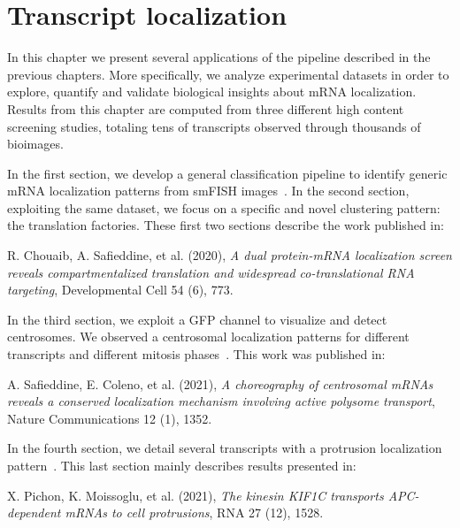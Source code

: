 
\graphicspath{{./figures/chapter5/}}

\chapter{Transcript localization}
\label{ch:chapter5}

\minitoc
\newpage

In this chapter we present several applications of the pipeline described in the previous chapters.
More specifically, we analyze experimental datasets in order to explore, quantify and validate biological insights about \ac{mRNA} localization.
Results from this chapter are computed from three different high content screening studies, totaling tens of transcripts observed through thousands of bioimages.

In the first section, we develop a general classification pipeline to identify generic \ac{mRNA} localization patterns from \ac{smFISH} images~\cite{CHOUAIB_2020}.
In the second section, exploiting the same dataset, we focus on a specific and novel clustering pattern: the translation factories.
These first two sections describe the work published in:

\begin{center}
	\color{green}
	R. Chouaib, A. Safieddine, et al. (2020), \textit{A dual protein-mRNA localization screen reveals compartmentalized translation and widespread co-translational RNA targeting}, Developmental Cell 54 (6), 773.
\end{center}

In the third section, we exploit a \ac{GFP} channel to visualize and detect centrosomes.
We observed a centrosomal localization patterns for different transcripts and different mitosis phases~\cite{safieddine_choreography_2021}.
This work was published in:

\begin{center}
	\color{green}
	A. Safieddine, E. Coleno, et al. (2021), \textit{A choreography of centrosomal mRNAs reveals a conserved localization mechanism involving active polysome transport}, Nature Communications 12 (1), 1352.
\end{center}

In the fourth section, we detail several transcripts with a protrusion localization pattern~\cite{pichon_kinesin_2021}.
This last section mainly describes results presented in:

\begin{center}
	\color{green}
	X. Pichon, K. Moissoglu, et al. (2021), \textit{The kinesin KIF1C transports APC-dependent mRNAs to cell protrusions}, RNA 27 (12), 1528.
\end{center}

